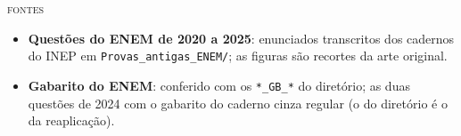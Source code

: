 \documentclass[11pt,a4paper]{article}
\begin{document}
\bigskip

\begin{painel}
{\small\scshape\color{grafite}fontes}\par\smallskip
\small
\begin{itemize}[nosep, leftmargin=1.5em]
  \item \textbf{Quest\~oes do ENEM de 2020 a 2025}: enunciados transcritos dos
        cadernos do INEP em \texttt{Provas\_antigas\_ENEM/}; as figuras s\~ao
        recortes da arte original.
  \item \textbf{Gabarito do ENEM}: conferido com os \texttt{*\_GB\_*} do
        diret\'orio; as duas quest\~oes de 2024 com o gabarito do caderno
        cinza regular (o do diret\'orio \'e o da reaplica\c{c}\~ao).
\end{itemize}
\end{painel}
\end{document}
